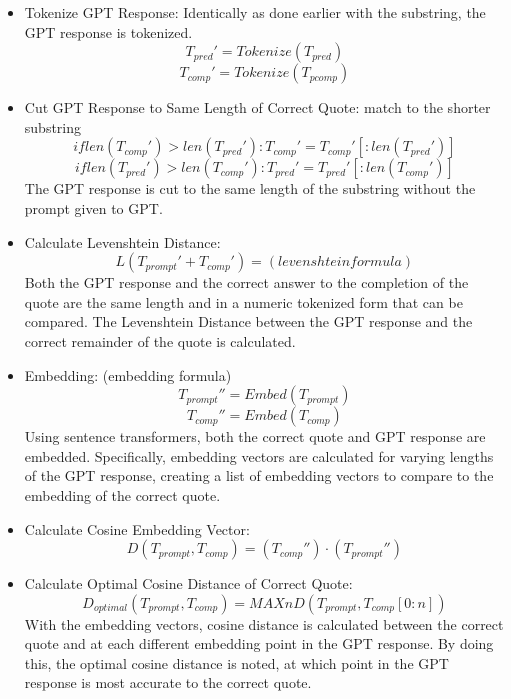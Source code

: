 \documentclass{article}
\begin{document}
\begin{itemize}
    \item Tokenize GPT Response:
Identically as done earlier with the substring, the GPT response is tokenized.
\begin{equation}
    T_{pred}'= Tokenize(T_{pred})
\end{equation}
\begin{equation}
    T_{comp}'= Tokenize(T_{pcomp})
\end{equation}
    \item Cut GPT Response to Same Length of Correct Quote: match to the shorter substring
\begin{equation}
    if len(T_{comp}') > len(T_{pred}'):
    T_{comp}' = T_{comp}'[:len(T_{pred}')]
\end{equation}
\begin{equation}
    if len(T_{pred}') > len(T_{comp}'):
    T_{pred}' = T_{pred}'[:len(T_{comp}')]
\end{equation}
The GPT response is cut to the same length of the substring without the prompt given to GPT.
    \item Calculate Levenshtein Distance: 
    \begin{equation}
     L(T_{prompt}'+T_{comp}') = (levenshtein formula)
\end{equation}
Both the GPT response and the correct answer to the completion of the quote are the same length and in a numeric tokenized form that can be compared. The Levenshtein Distance between the GPT response and the correct remainder of the quote is calculated. 
    \item Embedding: (embedding formula)
    \begin{equation}
    T_{prompt}''= Embed(T_{prompt})
    \end{equation}
    \begin{equation}
    T_{comp}''= Embed(T_{comp})
    \end{equation}
Using sentence transformers, both the correct quote and GPT response are embedded. Specifically, embedding vectors are calculated for varying lengths of the GPT response, creating a list of embedding vectors to compare to the embedding of the correct quote.

\item Calculate Cosine Embedding Vector:
\begin{equation}     
    D(T_{prompt},T_{comp})= (T_{comp}'') \cdot (T_{prompt}'')
\end{equation}

\item Calculate Optimal Cosine Distance of Correct Quote:
\begin{equation}
    D_{optimal}(T_{prompt},T_{comp})= MAX n D(T_{prompt},T_{comp}[0:n])
\end{equation}
With the embedding vectors, cosine distance is calculated between the correct quote and at each different embedding point in the GPT response. By doing this, the optimal cosine distance is noted, at which point in the GPT response is most accurate to the correct quote. 


\end{itemize}
\end{document}
